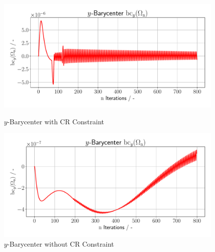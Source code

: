 \begin{figure}[h]
    \begin{minipage}{.5\textwidth}
        \centering
        \includegraphics[width=1\textwidth]{figures/bc_y_plot.pdf}
        \caption{$y$-Barycenter with CR Constraint}
        \label{plot_ref_bc_y_good}
    \end{minipage}
    \begin{minipage}{.5\textwidth}
        \centering
        \includegraphics[width=1\textwidth]{figures/bc_y_plot_bad.pdf}
        \caption{$y$-Barycenter without CR Constraint}
        \label{plot_ref_bc_y_bad}
    \end{minipage}
\end{figure}
